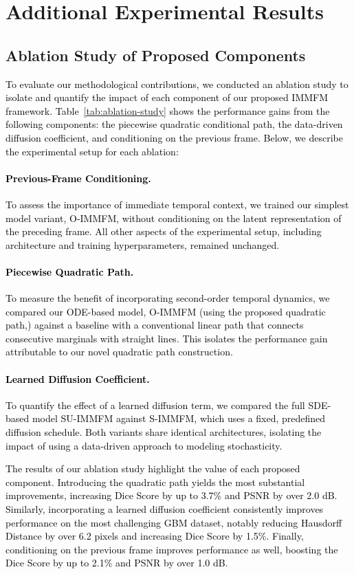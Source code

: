 \documentclass[twoside]{article}
\newcommand{\bc}[1]{\textcolor{black}{#1}}
\begin{document}
\section{Additional Experimental Results}
\label{app:additional_results}



\subsection{Ablation Study of Proposed Components}
\label{app:ablation-study}
\bc{
To evaluate our methodological contributions, we conducted an ablation study to isolate and quantify the impact of each component of our proposed IMMFM framework. Table~\ref{tab:ablation-study} shows the performance gains from the following components: the piecewise quadratic conditional path, the data-driven diffusion coefficient, and conditioning on the previous frame. Below, we describe the experimental setup for each ablation:
\paragraph{Previous-Frame Conditioning.} To assess the importance of immediate temporal context, we trained our simplest model variant, O-IMMFM, without conditioning on the latent representation of the preceding frame. All other aspects of the experimental setup, including architecture and training hyperparameters, remained unchanged.
\paragraph{Piecewise Quadratic Path.} To measure the benefit of incorporating second-order temporal dynamics, we compared our ODE-based model, O-IMMFM (using the proposed quadratic path,) against a baseline with a conventional linear path that connects consecutive marginals with straight lines. This isolates the performance gain attributable to our novel quadratic path construction.
\paragraph{Learned Diffusion Coefficient.} To quantify the effect of a learned diffusion term, we compared the full SDE-based model SU-IMMFM against S-IMMFM, which uses a fixed, predefined diffusion schedule. Both variants share identical architectures, isolating the impact of using a data-driven approach to modeling stochasticity.}

\bc{The results of our ablation study highlight the value of each proposed component. Introducing the quadratic path yields the most substantial improvements, increasing Dice Score by up to 3.7\% and PSNR by over 2.0 dB. Similarly, incorporating a learned diffusion coefficient consistently improves performance on the most challenging GBM dataset, notably reducing Hausdorff Distance by over 6.2 pixels and increasing Dice Score by 1.5\%. Finally, conditioning on the previous frame improves performance as well, boosting the Dice Score by up to 2.1\% and PSNR by over 1.0 dB.}
\end{document}

